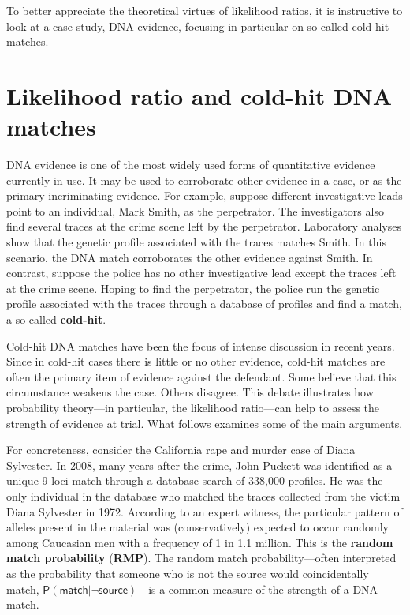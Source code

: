 \documentclass[10pt,dvipsnames,enabledeprecatedfontcommands]{scrartcl}
\newcommand{\pr}[1]{\mathsf{P}(#1)}
\begin{document}
To better appreciate the theoretical virtues of likelihood ratios, it is
instructive to look at a case study, DNA evidence, focusing in
particular on so-called cold-hit matches.

\section{\texorpdfstring{Likelihood ratio and cold-hit DNA matches
\label{subsec:cold-hit}}{Likelihood ratio and cold-hit DNA matches }}\label{likelihood-ratio-and-cold-hit-dna-matches}

DNA evidence is one of the most widely used forms of quantitative
evidence currently in use. It may be used to corroborate other evidence
in a case, or as the primary incriminating evidence. For example,
suppose different investigative leads point to an individual, Mark
Smith, as the perpetrator. The investigators also find several traces at
the crime scene left by the perpetrator. Laboratory analyses show that
the genetic profile associated with the traces matches Smith. In this
scenario, the DNA match corroborates the other evidence against Smith.
In contrast, suppose the police has no other investigative lead except
the traces left at the crime scene. Hoping to find the perpetrator, the
police run the genetic profile associated with the traces through a
database of profiles and find a match, a so-called \textbf{cold-hit}.

Cold-hit DNA matches have been the focus of intense discussion in recent
years. Since in cold-hit cases there is little or no other evidence,
cold-hit matches are often the primary item of evidence against the
defendant. Some believe that this circumstance weakens the case. Others
disagree. This debate illustrates how probability theory---in
particular, the likelihood ratio---can help to assess the strength of
evidence at trial. What follows examines some of the main arguments.

For concreteness, consider the California rape and murder case of Diana
Sylvester. In 2008, many years after the crime, John Puckett was
identified as a unique 9-loci match through a database search of 338,000
profiles. He was the only individual in the database who matched the
traces collected from the victim Diana Sylvester in 1972. According to
an expert witness, the particular pattern of alleles present in the
material was (conservatively) expected to occur randomly among Caucasian
men with a frequency of 1 in 1.1 million. This is the
\textbf{random match probability} (\textbf{RMP}). The random match
probability---often interpreted as the probability that someone who is
not the source would coincidentally match,
\(\pr{\textsf{match} \vert \neg \textsf{source}}\)---is a common measure
of the strength of a DNA match.
\end{document}
